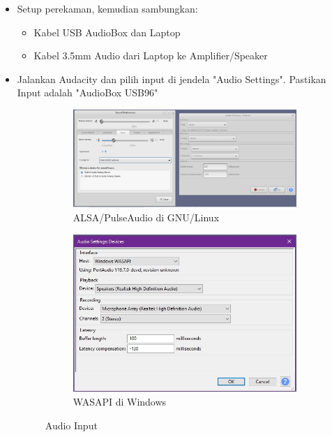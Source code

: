 \documentclass{article}
\begin{document}
	\begin{itemize}
		\item Setup perekaman, kemudian sambungkan:
		\begin{itemize}
			\item Kabel USB AudioBox dan Laptop
			\item Kabel 3.5mm Audio dari Laptop ke Amplifier/Speaker
		\end{itemize}
	
		\item Jalankan Audacity dan pilih input di jendela "Audio Settings".
		Pastikan Input adalah "AudioBox USB96"
		
		\begin{figure}[H]
			\centering
			\begin{subfigure}[]{.55\textwidth}
				\includegraphics[width=\textwidth]{images/audacity_in_linux}
				\caption{ALSA/PulseAudio di GNU/Linux}
			\end{subfigure}
			\begin{subfigure}[]{.35\textwidth}
				\includegraphics[width=\textwidth]{images/audacity_in_windows}
				\caption{WASAPI di Windows}
			\end{subfigure}
			\caption{Audio Input}
		\end{figure}
	

\end{itemize}
\end{document}

